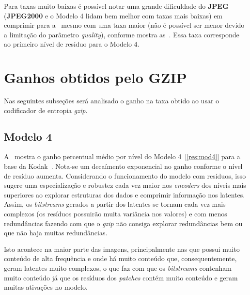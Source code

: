 Para taxas muito baixas é possível notar uma grande dificuldade do \textbf{JPEG} (\textbf{JPEG2000} e o Modelo 4 lidam bem melhor com taxas mais baixas) em comprimir para a~ mesmo com uma taxa maior (não é possível ser menor devido a limitação do parâmetro \textit{quality}), conforme mostra as~. Essa taxa corresponde ao primeiro nível de resíduo para o Modelo 4.

\section{Ganhos obtidos pelo GZIP}
\label{res:gzip}
Nas seguintes subseções será analisado o ganho na taxa obtido ao usar o codificador de entropia \textit{gzip}.
\subsection{Modelo 4}
A~ mostra o ganho percentual médio por nível do Modelo 4~[\ref{res:mod4}] para a base da Kodak~\cite{kodak}. Nota-se um decaímento exponencial no ganho conforme o nível de resíduo aumenta. Considerando o funcionamento do modelo com resíduos, isso sugere uma especialização e robustez cada vez maior nos \textit{encoders} dos níveis mais superiores ao explorar estruturas dos dados e comprimir informação nos latentes. Assim, os \textit{bitstreams} gerados a partir dos latentes se tornam cada vez mais complexos (os resíduos possuirão muita variância nos valores) e com menos redundâncias fazendo com que o \textit{gzip} não consiga explorar redundâncias bem ou que não haja muitas redundâncias. 

Isto acontece na maior parte das imagens, principalmente nas que possui muito conteúdo de alta frequência e onde há muito conteúdo que, consequentemente, geram latentes muito complexos, o que faz com que os \textit{bitstreams} contenham muito conteúdo já que os resíduos dos \textit{patches} contém muito conteúdo e geram muitas ativações no modelo.

